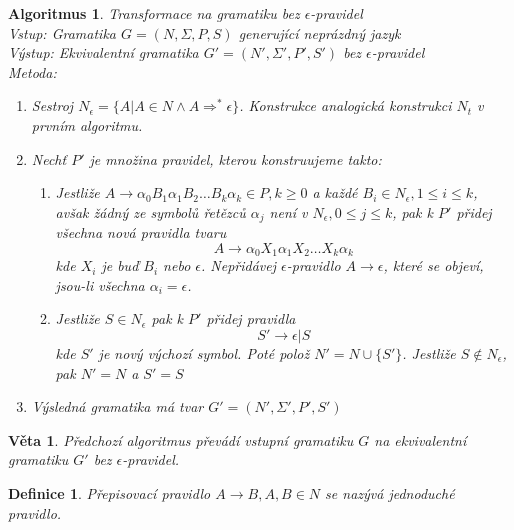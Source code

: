 \documentclass[a4paper, 11pt]{report}
\newtheorem{mydef}{Definice}[chapter]
\newtheorem{veta}{Věta}[chapter]
\newtheorem{alg}{Algoritmus}[chapter]
\begin{document}
\begin{alg}
Transformace na gramatiku bez $\epsilon$-pravidel\\
Vstup: Gramatika $G = (N, \Sigma, P, S)$ generující neprázdný jazyk\\
Výstup: Ekvivalentní gramatika $G' = (N', \Sigma', P', S')$ bez $\epsilon$-pravidel\\
Metoda:
\begin{enumerate}
	\item Sestroj $N_\epsilon = \{ A | A \in N \land A \Rightarrow^* \epsilon \}$. Konstrukce analogická konstrukci $N_t$ v prvním algoritmu.
	\item Nechť $P'$ je množina pravidel, kterou konstruujeme takto:
	\begin{enumerate}
		\item Jestliže $A \to \alpha_0 B_1 \alpha_1 B_2 \dots B_k \alpha_k \in P, k \geq 0$ a každé $B_i \in N_\epsilon, 1 \leq i \leq k$, avšak žádný ze symbolů řetězců $\alpha_j$ není v $N_\epsilon, 0 \leq j \leq k$, pak k $P'$ přidej všechna nová pravidla tvaru
		$$A \to \alpha_0 X_1 \alpha_1 X_2 \dots X_k \alpha_k$$
		kde $X_i$ je buď $B_i$ nebo $\epsilon$. Nepřidávej $\epsilon$-pravidlo $A \to \epsilon$, které se objeví, jsou-li všechna $\alpha_i = \epsilon$.
		\item Jestliže $S \in N_\epsilon$ pak k $P'$ přidej pravidla
		$$S' \to \epsilon | S $$
		kde $S'$ je nový výchozí symbol. Poté polož $N' = N \cup \{S'\}$. Jestliže $S \not\in N_\epsilon$, pak $N' = N$ a $S' = S$
	\end{enumerate}
	\item Výsledná gramatika má tvar $G' = (N', \Sigma', P', S')$
\end{enumerate}
\end{alg}

\begin{veta}
Předchozí algoritmus převádí vstupní gramatiku $G$ na ekvivalentní gramatiku $G'$ bez $\epsilon$-pravidel.
\end{veta}

\begin{mydef}
Přepisovací pravidlo $A \to B, A,B \in N$ se nazývá jednoduché pravidlo.
\end{mydef}
\end{document}
